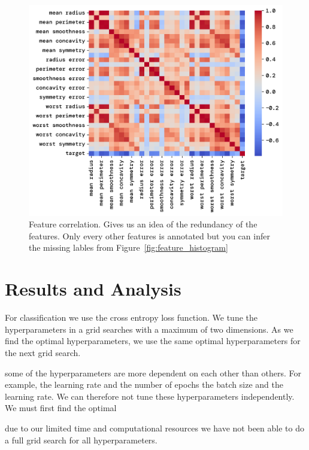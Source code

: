 \documentclass[twoside,11pt]{report}
\begin{document}
\begin{figure}
    \begin{center}
        \includegraphics[width=\textwidth]{../runsAndFigures/feature_correlation.png}
    \end{center}
    \caption{Feature correlation. Gives us an idea of the redundancy of the features.
        Only every other features is annotated but you can infer the missing lables 
    from Figure~\ref{fig:feature_histogram}}\label{fig:feature_correlation}
\end{figure}




\section{Results and Analysis}
\label{sec:resultsdiscussion}

For classification we use the cross entropy loss function. 
We tune the hyperparameters in a grid searches with a maximum
of two dimensions. As we find the optimal hyperparameters, we use the same optimal hyperparameters for the next grid search.

some of the hyperparameters are more dependent on each other than others. For example, the learning rate and the number of epochs
the batch size and the learning rate. We can therefore not tune these hyperparameters independently. We must first find the optimal

due to our limited time and computational resources we have not been able to do a full grid search for all hyperparameters. 
\end{document}
